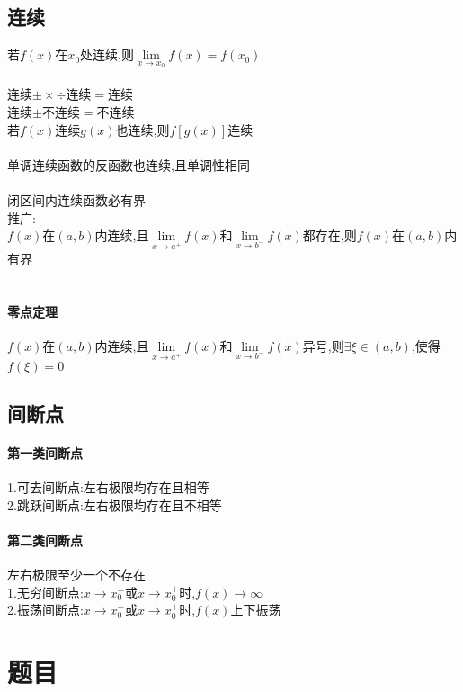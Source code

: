\documentclass{article}
\begin{document}
\begin{flushleft}
	\subsection{连续}
	
	若$f(x)$在$x_0$处连续,则$\lim\limits_{x\to x_0} f(x)=f(x_0)$\\
	~\\
	连续$\pm\times\div$连续$=$连续\\
	连续$\pm$不连续$=$不连续\\
	若$f(x)$连续$g(x)$也连续,则$f[g(x)]$连续\\
	~\\
	单调连续函数的反函数也连续,且单调性相同\\
	~\\
	闭区间内连续函数必有界\\
	推广:\\
	$f(x)$在$(a,b)$内连续,且$\lim\limits_{x\to a^+} f(x)$和$\lim\limits_{x\to b^-} f(x)$都存在,则$f(x)$在$(a,b)$内有界\\
	~\\
	\paragraph{零点定理}
	$f(x)$在$(a,b)$内连续,且$\lim\limits_{x\to a^+} f(x)$和$\lim\limits_{x\to b^-} f(x)$异号,则$\exists \xi \in (a,b)$,使得$f(\xi)=0$\\
	
	\subsection{间断点}
	
	\paragraph{第一类间断点}
	1.可去间断点:左右极限均存在且相等\\
	2.跳跃间断点:左右极限均存在且不相等\\
	\paragraph{第二类间断点}
	左右极限至少一个不存在\\
	1.无穷间断点:$x\to x_0^-$或$x\to x_0^+$时,$f(x)\to \infty$\\
	2.振荡间断点:$x\to x_0^-$或$x\to x_0^+$时,$f(x)$上下振荡\\

	\section{题目}
	

\end{flushleft}
\end{document}
